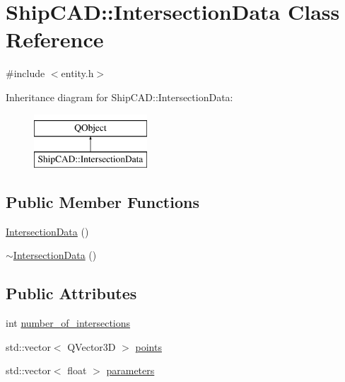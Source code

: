 \hypertarget{classShipCAD_1_1IntersectionData}{\section{Ship\-C\-A\-D\-:\-:Intersection\-Data Class Reference}
\label{classShipCAD_1_1IntersectionData}
}


{\ttfamily \#include $<$entity.\-h$>$}

Inheritance diagram for Ship\-C\-A\-D\-:\-:Intersection\-Data\-:\begin{figure}[H]
\begin{center}
\leavevmode
\includegraphics[height=2.000000cm]{classShipCAD_1_1IntersectionData}
\end{center}
\end{figure}
\subsection*{Public Member Functions}
\begin{DoxyCompactItemize}
\item 
\hyperlink{classShipCAD_1_1IntersectionData_acc582d8820d6e60117e0bf5fe686ab76}{Intersection\-Data} ()
\item 
\hyperlink{classShipCAD_1_1IntersectionData_a80ee22151368715711e3713eae61d401}{$\sim$\-Intersection\-Data} ()
\end{DoxyCompactItemize}
\subsection*{Public Attributes}
\begin{DoxyCompactItemize}
\item 
int \hyperlink{classShipCAD_1_1IntersectionData_ab6b41dcefd115d57e47864b4ed028bc8}{number\-\_\-of\-\_\-intersections}
\item 
std\-::vector$<$ Q\-Vector3\-D $>$ \hyperlink{classShipCAD_1_1IntersectionData_a926e126e42d95e01b39e2750a0e1fb95}{points}
\item 
std\-::vector$<$ float $>$ \hyperlink{classShipCAD_1_1IntersectionData_a06fcbb71243644bdea0e5b86da3b191c}{parameters}
\end{DoxyCompactItemize}


